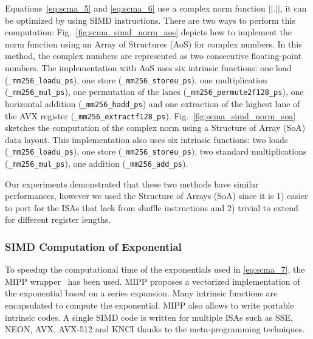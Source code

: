 Equations~\eqref{eq:scma_5} and \eqref{eq:scma_6} use a complex norm function
$||.||$, it can be optimized by using SIMD instructions. There are two ways to
perform this computation: Fig.~\ref{fig:scma_simd_norm_aos} depicts how to
implement the norm function using an Array of Structures (AoS) for complex
numbers. In this method, the complex numbers are represented as two consecutive
floating-point numbers. The implementation with AoS uses six intrinsic
functions: one load (\verb|_mm256_loadu_ps|), one store
(\verb|_mm256_storeu_ps|), one multiplication (\verb|_mm256_mul_ps|), one
permutation of the lanes (\verb|_mm256_permute2f128_ps|), one horizontal
addition (\verb|_mm256_hadd_ps|) and one extraction of the highest lane of the
AVX register (\verb|_mm256_extractf128_ps|). Fig.~\ref{fig:scma_simd_norm_soa}
sketches the computation of the complex norm using a Structure of Array (SoA)
data layout. This implementation also uses six intrinsic functions: two loads
(\verb|_mm256_loadu_ps|), one store (\verb|_mm256_storeu_ps|), two standard
multiplications (\verb|_mm256_mul_ps|), one addition (\verb|_mm256_add_ps|).

Our experiments demonstrated that these two methods have similar performances,
however we used the Structure of Arrays (SoA) since it is 1) easier to port for
the ISAs that lack from shuffle instructions and 2) trivial to extend for
different register lengths.

\subsubsection{SIMD Computation of Exponential}

To speedup the computational time of the exponentials used in \eqref{eq:scma_7},
the MIPP wrapper~\cite{Cassagne2018} has been used. MIPP proposes a vectorized
implementation of the exponential based on a series expansion. Many intrinsic
functions are encapsulated to compute the exponential. MIPP also allows to write
portable intrinsic codes. A single SIMD code is written for multiple ISAs such
as SSE, NEON, AVX, AVX-512 and KNCI thanks to the meta-programming techniques.

